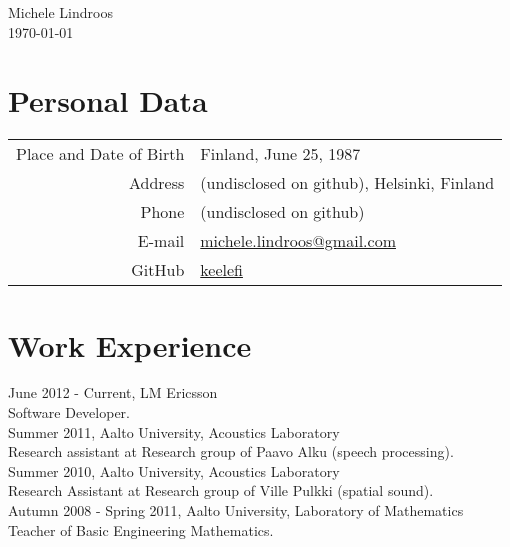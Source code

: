 \documentclass[12pt]{article}
\begin{document}

\begin{center}
\Huge{Michele Lindroos} \\
\normalsize{\today}
\end{center}


\section*{Personal Data}
\begin{tabular}{rl}
Place and Date of Birth & Finland, June 25, 1987\\
Address & (undisclosed on github), Helsinki, Finland\\
Phone & (undisclosed on github)\\
E-mail & \href{mailto:michele.lindroos@gmail.com}{michele.lindroos@gmail.com}\\
GitHub & \href{https://github.com/keelefi}{keelefi}
\end{tabular}


\section*{Work Experience}

\large{June 2012 - Current, LM Ericsson}\\
\normalsize{Software Developer.}\\

\large{Summer 2011, Aalto University, Acoustics Laboratory}\\
\normalsize{Research assistant at Research group of Paavo Alku (speech
processing).}\\

\large{Summer 2010, Aalto University, Acoustics Laboratory}\\
\normalsize{Research Assistant at Research group of Ville Pulkki (spatial
sound).}\\

\large{Autumn 2008 - Spring 2011, Aalto University, Laboratory of Mathematics}\\
\normalsize{Teacher of Basic Engineering Mathematics.}\\
\end{document}
